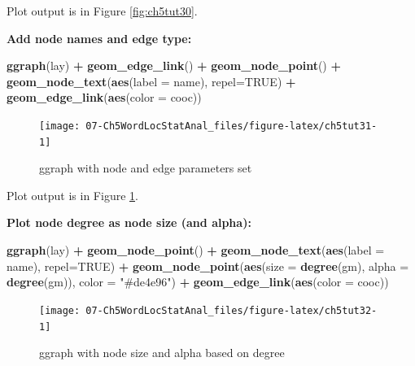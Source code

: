 \documentclass[
]{article}
\newenvironment{Shaded}{\begin{snugshade}}{\end{snugshade}}
\newcommand{\AttributeTok}[1]{\textcolor[rgb]{0.13,0.29,0.53}{#1}}
\newcommand{\ConstantTok}[1]{\textcolor[rgb]{0.56,0.35,0.01}{#1}}
\newcommand{\FunctionTok}[1]{\textcolor[rgb]{0.13,0.29,0.53}{\textbf{#1}}}
\newcommand{\NormalTok}[1]{#1}
\newcommand{\SpecialCharTok}[1]{\textcolor[rgb]{0.81,0.36,0.00}{\textbf{#1}}}
\newcommand{\StringTok}[1]{\textcolor[rgb]{0.31,0.60,0.02}{#1}}
\begin{document}
Plot output is in Figure \ref{fig:ch5tut30}.

\textbf{Add node names and edge type:}

\begin{Shaded}
\begin{Highlighting}[]
\FunctionTok{ggraph}\NormalTok{(lay) }\SpecialCharTok{+} 
    \FunctionTok{geom\_edge\_link}\NormalTok{() }\SpecialCharTok{+} 
    \FunctionTok{geom\_node\_point}\NormalTok{() }\SpecialCharTok{+} 
    \FunctionTok{geom\_node\_text}\NormalTok{(}\FunctionTok{aes}\NormalTok{(}\AttributeTok{label =}\NormalTok{ name), }\AttributeTok{repel=}\ConstantTok{TRUE}\NormalTok{) }\SpecialCharTok{+}
    \FunctionTok{geom\_edge\_link}\NormalTok{(}\FunctionTok{aes}\NormalTok{(}\AttributeTok{color =}\NormalTok{ cooc))}
\end{Highlighting}
\end{Shaded}

\begin{figure}

{\centering \texttt{[image: 07-Ch5WordLocStatAnal\_files/figure-latex/ch5tut31-1]} 

}

\caption{ggraph with node and edge parameters set}\label{fig:ch5tut31}
\end{figure}

Plot output is in Figure \ref{fig:ch5tut31}.

\textbf{Plot node degree as node size (and alpha):}

\begin{Shaded}
\begin{Highlighting}[]
\FunctionTok{ggraph}\NormalTok{(lay) }\SpecialCharTok{+} 
    \FunctionTok{geom\_node\_point}\NormalTok{() }\SpecialCharTok{+} 
    \FunctionTok{geom\_node\_text}\NormalTok{(}\FunctionTok{aes}\NormalTok{(}\AttributeTok{label =}\NormalTok{ name), }\AttributeTok{repel=}\ConstantTok{TRUE}\NormalTok{) }\SpecialCharTok{+}
    \FunctionTok{geom\_node\_point}\NormalTok{(}\FunctionTok{aes}\NormalTok{(}\AttributeTok{size =} \FunctionTok{degree}\NormalTok{(gm), }\AttributeTok{alpha =} \FunctionTok{degree}\NormalTok{(gm)), }
                    \AttributeTok{color =} \StringTok{"\#de4e96"}\NormalTok{) }\SpecialCharTok{+}
    \FunctionTok{geom\_edge\_link}\NormalTok{(}\FunctionTok{aes}\NormalTok{(}\AttributeTok{color =}\NormalTok{ cooc))}
\end{Highlighting}
\end{Shaded}

\begin{figure}

{\centering \texttt{[image: 07-Ch5WordLocStatAnal\_files/figure-latex/ch5tut32-1]} 

}

\caption{ggraph with node size and alpha based on degree}\label{fig:ch5tut32}
\end{figure}
\end{document}
